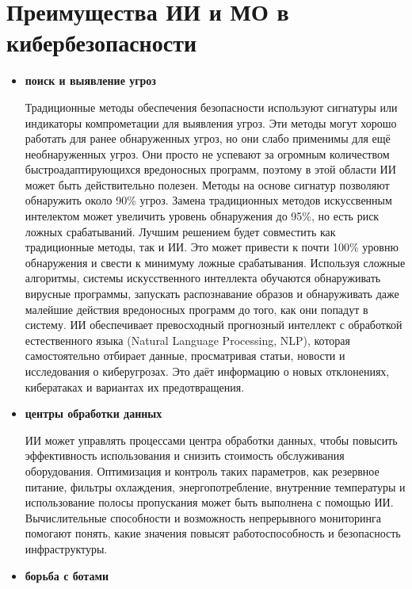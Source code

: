 \documentclass{article}
\begin{document}
\section*{Преимущества ИИ и МО в кибербезопасности}
\begin{itemize}
    \item \textbf{поиск и выявление угроз}
    
Традиционные методы обеспечения безопасности используют сигнатуры или индикаторы компрометации для выявления угроз. Эти методы могут хорошо работать для ранее обнаруженных угроз, но они слабо применимы для ещё необнаруженных угроз. Они просто не успевают за огромным количеством быстроадаптирующихся вредоносных программ, поэтому в этой области ИИ может быть действительно полезен. 
Методы на основе сигнатур позволяют обнаружить около 90\% угроз. Замена традиционных методов искуссвенным интелектом может увеличить уровень обнаружения до 95\%, но есть риск ложных срабатываний. Лучшим решением будет совместить как традиционные методы, так и ИИ. Это может привести к почти 100\% уровню обнаружения и свести к минимуму ложные срабатывания.
Используя сложные алгоритмы, системы искусственного интеллекта обучаются обнаруживать вирусные программы, запускать распознавание образов и обнаруживать даже малейшие действия вредоносных программ до того, как они попадут в систему. ИИ обеспечивает превосходный прогнозный интеллект с обработкой естественного языка (Natural Language Processing, NLP), которая самостоятельно отбирает данные, просматривая статьи, новости и исследования о киберугрозах. Это даёт информацию о новых отклонениях, кибератаках и вариантах их предотвращения.
    \item \textbf{центры обработки данных}
    
ИИ может управлять процессами центра обработки данных, чтобы повысить эффективность использования и снизить стоимость обслуживания оборудования. Оптимизация и контроль таких параметров, как резервное питание, фильтры охлаждения, энергопотребление, внутренние температуры и использование полосы пропускания может быть выполнена с помощью ИИ. Вычислительные способности и возможность непрерывного мониторинга помогают понять, какие значения повысят работоспособность и безопасность инфраструктуры.
    \item \textbf{борьба с ботами}
    

\end{itemize}
\end{document}
